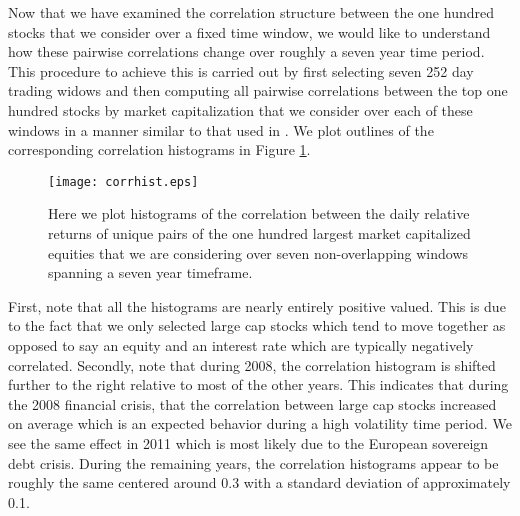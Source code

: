 \documentclass{amsart}
\begin{document}
Now that we have examined the correlation structure between the one hundred stocks that we 
consider over a fixed time window, we would like to understand how these 
pairwise correlations change over roughly a seven year time period. 
This procedure to achieve this is carried out by 
first selecting seven 252 day trading widows and then computing all pairwise 
correlations between the top one hundred stocks by market capitalization that 
we consider over each of these windows in 
a manner similar to that used in \cite{Boginski-06}. We plot outlines of the corresponding 
correlation histograms in Figure \ref{corrhist}.  
%
\begin{figure}[h!]
    \centering
    \texttt{[image: corrhist.eps]}
    \caption{Here we plot histograms of the correlation between the daily relative returns of 
        unique pairs of the one hundred largest market capitalized 
        equities that we are considering over seven non-overlapping windows spanning a 
        seven year timeframe. }
    \label{corrhist}
\end{figure}
%

First, note that all the histograms are nearly entirely positive valued.  This is 
due to the fact that we only selected large cap stocks which tend to move together as 
opposed to say an equity and an interest rate which are typically negatively correlated. 
Secondly, note that during 2008, the correlation histogram is shifted further to the right
relative to most of the other years. 
This indicates that during the 2008 financial crisis, that the correlation between large cap 
stocks increased on average which is an expected behavior during a high volatility time period. 
We see the same effect 
in 2011 which is most likely due to the European sovereign debt crisis.  During the remaining 
years, the correlation histograms appear to be roughly the same centered around 0.3 with a 
standard deviation of approximately 0.1. 
\end{document}
